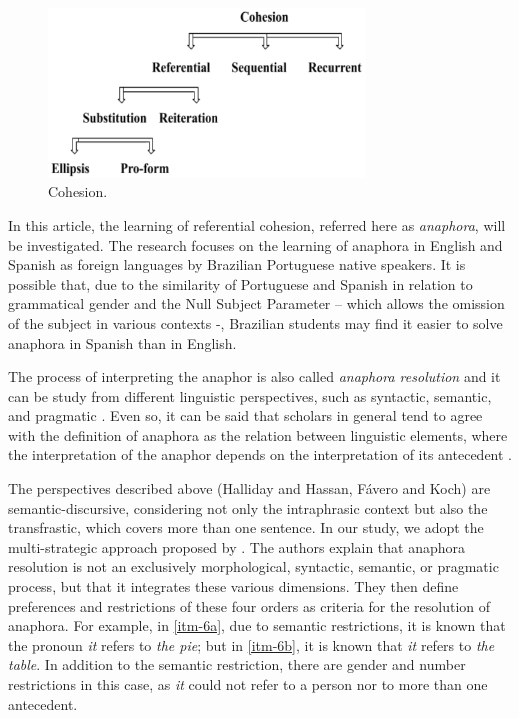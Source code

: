 \documentclass{textolivre}
\begin{document}
% 
%
\begin{figure}[htbp]
 \centering
 \includegraphics[width=0.75\textwidth]{fig02.png}
 \caption{Cohesion.}
 \label{fig02}
\end{figure}




In this article, the learning of referential cohesion, referred here as
\emph{anaphora}, will be investigated. The research focuses on the
learning of anaphora in English and Spanish as foreign languages by
Brazilian Portuguese native speakers. It is possible that, due to the
similarity of Portuguese and Spanish in relation to grammatical gender
and the Null Subject Parameter \cite{chomsky_lectures_1981,rizzi_issues_1982} -- which
allows the omission of the subject in various contexts -, Brazilian
students may find it easier to solve anaphora in Spanish than in
English.

The process of interpreting the anaphor is also called \emph{anaphora
resolution} \cite{hirstanaphora1981,mcdonald_time_1995,mitkov_oxford_2005} 
and it can be study from different linguistic perspectives, such as
syntactic, semantic, and pragmatic \cite{ariel_interpreting_1994,arnold_effect_2001,grosz_centering:_1995,rahman_coreference_2011}.
Even so, it can be said 
that scholars in general tend to agree with the definition of anaphora
as the relation between linguistic elements, where the interpretation of
the anaphor depends on the interpretation of its antecedent \cite[p. 1]{huanganaphora2000}.

The perspectives described above (Halliday and Hassan, Fávero and Koch)
are semantic-discursive, considering not only the intraphrasic context
but also the transfrastic, which covers more than one sentence. In our
study, we adopt the multi-strategic approach proposed by \textcite{carbonell_anaphora_1988}.
The authors explain that anaphora resolution is not an
exclusively morphological, syntactic, semantic, or pragmatic process,
but that it integrates these various dimensions. They then define
preferences and restrictions of these four orders as criteria for the
resolution of anaphora. For example, in \ref{itm-6a}, due to semantic
restrictions, it is known that the pronoun \emph{it} refers to \emph{the
pie}; but in \ref{itm-6b}, it is known that \emph{it} refers to \emph{the
table}. In addition to the semantic restriction, there are gender and
number restrictions in this case, as \emph{it} could not refer to a
person nor to more than one antecedent.
\end{document}
